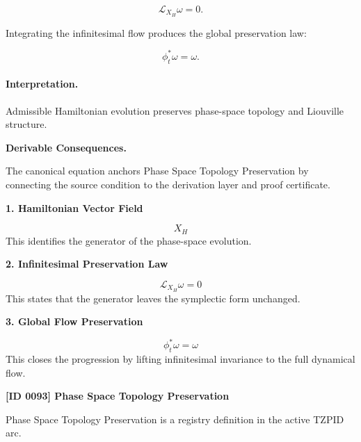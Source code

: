\begin{equation}
\mathcal{L}_{X_H}\omega=0.
\end{equation}

Integrating the infinitesimal flow produces the global preservation law:

\begin{equation}
\boxed{
\phi_t^{*}\omega=\omega.
}
\end{equation}

\paragraph{Interpretation.}
Admissible Hamiltonian evolution preserves phase-space topology and Liouville structure.

\par\vspace{0.35em}
\noindent\textbf{Derivable Consequences.}\quad
\begingroup
\footnotesize
\raggedright
The canonical equation anchors Phase Space Topology Preservation by connecting the source condition to the derivation layer and proof certificate.
\par\endgroup

\noindent\textbf{1. Hamiltonian Vector Field}\par
\[
X_H
\]
\noindent This identifies the generator of the phase-space evolution.\par
\noindent\textbf{2. Infinitesimal Preservation Law}\par
\[
\mathcal{L}_{X_H}\omega = 0
\]
\noindent This states that the generator leaves the symplectic form unchanged.\par
\noindent\textbf{3. Global Flow Preservation}\par
\[
\phi_t^{\ast}\omega = \omega
\]
\noindent This closes the progression by lifting infinitesimal invariance to the full dynamical flow.\par

\clearpage
\noindent\textbf{[ID 0093] Phase Space Topology Preservation}\par
\vspace{0.35em}
\begingroup\small
{}
Phase Space Topology Preservation is a registry definition in the active TZPID arc.

